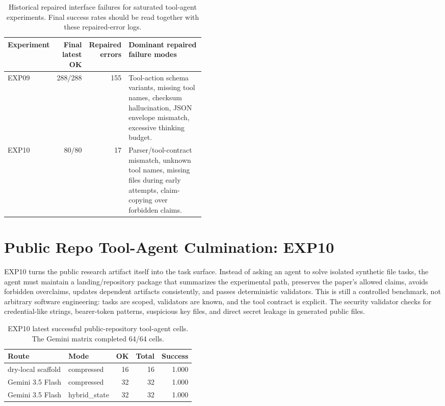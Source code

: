 \documentclass[11pt]{article}
\begin{document}
\begin{table}[ht]
\centering
\small
\begin{tabular}{lrrp{0.45\linewidth}}
\toprule
Experiment & Final latest OK & Repaired errors & Dominant repaired failure modes \\
\midrule
EXP09 & 288/288 & 155 & Tool-action schema variants, missing tool names, checksum hallucination, JSON envelope mismatch, excessive thinking budget. \\
EXP10 & 80/80 & 17 & Parser/tool-contract mismatch, unknown tool names, missing files during early attempts, claim-copying over forbidden claims. \\
\bottomrule
\end{tabular}
\caption{Historical repaired interface failures for saturated tool-agent experiments. Final success rates should be read together with these repaired-error logs.}
\label{tab:repaired_interface_failures}
\end{table}

\section{Public Repo Tool-Agent Culmination: EXP10}
EXP10 turns the public research artifact itself into the task surface. Instead of asking an agent to solve isolated synthetic file tasks, the agent must maintain a landing/repository package that summarizes the experimental path, preserves the paper's allowed claims, avoids forbidden overclaims, updates dependent artifacts consistently, and passes deterministic validators. This is still a controlled benchmark, not arbitrary software engineering: tasks are scoped, validators are known, and the tool contract is explicit. The security validator checks for credential-like strings, bearer-token patterns, suspicious key files, and direct secret leakage in generated public files.

\begin{table}[ht]
\centering
\small
\begin{tabular}{llrrr}
\toprule
Route & Mode & OK & Total & Success \\
\midrule
dry-local scaffold & compressed & 16 & 16 & 1.000 \\
Gemini 3.5 Flash & compressed & 32 & 32 & 1.000 \\
Gemini 3.5 Flash & hybrid\_state & 32 & 32 & 1.000 \\
\bottomrule
\end{tabular}
\caption{EXP10 latest successful public-repository tool-agent cells. The Gemini matrix completed 64/64 cells.}
\label{tab:exp10_route_mode}
\end{table}
\end{document}
